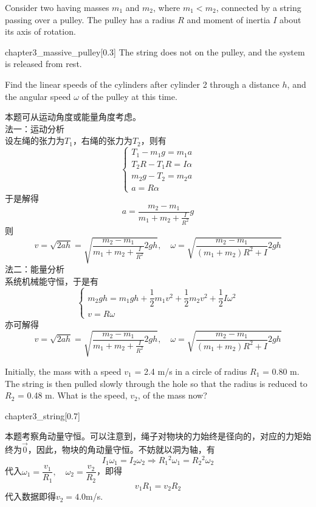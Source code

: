 \begin{solution}
	Consider two  having masses $m_1$
	and $m_2$, where $m_1 < m_2$, connected by a
	string passing over a pulley. The pulley
	has a radius $R$ and moment of inertia $I$
	about its axis of rotation.
	\begin{singlefigure}{chapter3_massive_pulley}[0.3]
		The string does
		not  on the pulley, and the system
		is released from rest. 
	\end{singlefigure}
	Find the linear
	speeds of the cylinders after
	cylinder 2  through a
	distance $h$, and the angular
	speed $\omega$ of the pulley at this time.
	
	\tcbrule
	
	本题可从运动角度或能量角度考虑。\\
	法一：运动分析\\
	设左绳的张力为$T_1$，右绳的张力为$T_2$，则有
	\[\left\{\begin{array}{c}
		T_1-m_1g=m_1a\\
		T_2R-T_1R=I\alpha\\
		m_2g-T_2=m_2a\\
		a=R\alpha
	\end{array}\right.\]
	于是解得
	\[a=\dfrac{m_2-m_1}{m_1+m_2+\frac{I}{R^2}}g\]
	则
	\[v=\sqrt{2ah}=\sqrt{\dfrac{m_2-m_1}{m_1+m_2+\frac{I}{R^2}}2gh},\quad\omega=\sqrt{\dfrac{m_2-m_1}{(m_1+m_2)R^2+I}2gh}\]
	法二：能量分析\\
	系统机械能守恒，于是有
	\[\left\{\begin{array}{c}
		m_2gh=m_1gh+\dfrac{1}{2}m_1v^2+\dfrac{1}{2}m_2v^2+\dfrac{1}{2}I\omega^2\\
		v=R\omega
	\end{array}\right.\]
	亦可解得
	\[v=\sqrt{2ah}=\sqrt{\dfrac{m_2-m_1}{m_1+m_2+\frac{I}{R^2}}2gh},\quad\omega=\sqrt{\dfrac{m_2-m_1}{(m_1+m_2)R^2+I}2gh}\]
\end{solution}
\begin{solution}
		Initially, the mass  with a speed $v_1$ = 2.4 m/s in
		a circle of radius $R_1$ = 0.80 m.
		The string is then pulled slowly through the hole so
		that the radius is reduced to $R_2$ = 0.48 m. What is the
		speed, $v_2$, of the mass now?
		\begin{singlefigure}{chapter3_string}[0.7]
		\end{singlefigure}
		
		\tcbrule
		
	本题考察角动量守恒。可以注意到，绳子对物块的力始终是径向的，对应的力矩始终为$\vec{0}$，因此，物块的角动量守恒。不妨就以洞为轴，有
	\[I_1\omega_1=I_2\omega_2\Rightarrow R_1{}^2\omega_1=R_2{}^2\omega_2\]
	代入$\omega_1=\dfrac{v_1}{R_1},\quad\omega_2=\dfrac{v_2}{R_2}$，即得
	\[v_1R_1=v_2R_2\]
	代入数据即得$v_2=4.0$m/s.
\end{solution}

